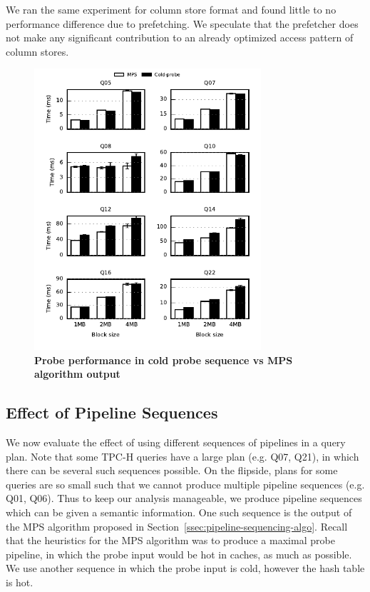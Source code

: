 We ran the same experiment for column store format and found little to no performance difference due to prefetching. 
We speculate that the prefetcher does not make any significant contribution to an already optimized access pattern of column stores.
\begin{figure}[ht]
	\centering 
	\includegraphics[width=0.75\textwidth]{pipeline/figures/first-probe-comparison-mps-vs-coldprobe-20threads-colstore-withlip}
	\caption{\textbf{Probe performance in cold probe sequence vs MPS algorithm output}}
	\label{fig:coldprobe-vs-mps}
\end{figure}

\subsection{Effect of Pipeline Sequences}
We now evaluate the effect of using different sequences of pipelines in a query plan. 
Note that some TPC-H queries have a large plan (e.g. Q07, Q21), in which there can be several such sequences possible.
On the flipside, plans for some queries are so small such that we cannot produce multiple pipeline sequences (e.g. Q01, Q06).
Thus to keep our analysis manageable, we produce pipeline sequences which can be given a semantic information. 
One such sequence is the output of the MPS algorithm proposed in Section~\ref{ssec:pipeline-sequencing-algo}.
Recall that the heuristics for the MPS algorithm was to produce a maximal probe pipeline, in which the probe input would be hot in caches, as much as possible.
We use another sequence in which the probe input is cold, however the hash table is hot. 


